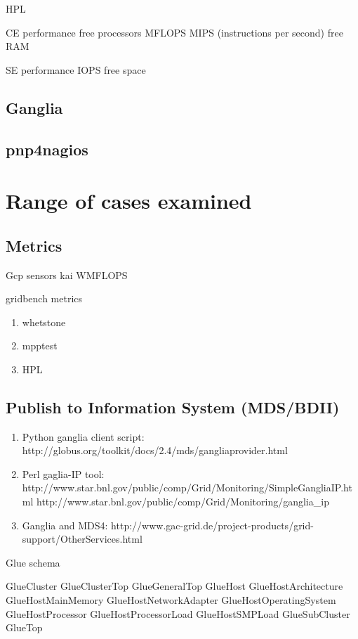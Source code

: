 HPL
\cite{gridbench}

CE performance
free processors
MFLOPS
MIPS (instructions per second)
free RAM

SE performance
IOPS
free space
\subsection{Ganglia}
\subsection{pnp4nagios}

\section{Range of cases examined}
\subsection{Metrics}
Gcp sensors kai WMFLOPS
\cite{gcpsensor}

gridbench metrics
\begin{enumerate}
  \item whetstone
  \item mpptest
  \item HPL
\end{enumerate}
\cite{gridbench} 

\subsection{Publish to Information System (MDS/BDII)}
\begin{enumerate}
  \item Python ganglia client script:
  http://globus.org/toolkit/docs/2.4/mds/gangliaprovider.html
  \item Perl gaglia-IP tool:
  http://www.star.bnl.gov/public/comp/Grid/Monitoring/SimpleGangliaIP.html
  http://www.star.bnl.gov/public/comp/Grid/Monitoring/ganglia\_ip
  \item Ganglia and MDS4:
  http://www.gac-grid.de/project-products/grid-support/OtherServices.html
\end{enumerate}

Glue schema

GlueCluster
GlueClusterTop
GlueGeneralTop
GlueHost
GlueHostArchitecture
GlueHostMainMemory
GlueHostNetworkAdapter
GlueHostOperatingSystem
GlueHostProcessor
GlueHostProcessorLoad
GlueHostSMPLoad
GlueSubCluster
GlueTop
